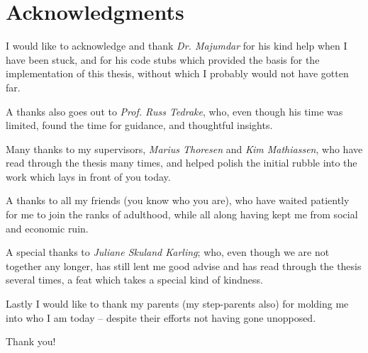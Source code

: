 \chapter*{Acknowledgments}

\noindent I would like to acknowledge and thank \textit{Dr.
  Majumdar} for his kind help when I have been stuck, and for his code stubs
which provided the basis for the implementation of this thesis, without which I
probably would not have gotten far.

\vspace{1em}

\noindent A thanks also goes out to \textit{Prof. Russ
  Tedrake}, who, even though his time was limited, found the time for guidance,
and thoughtful insights.

\vspace{1em}

\noindent Many thanks to my supervisors, \textit{Marius
  Thoresen} and \textit{Kim Mathiassen}, who have read through the thesis many
times, and helped polish the initial rubble into the work which lays in front of
you today.

\vspace{1em}

\noindent A thanks to all my friends (you know who you are),
who have waited patiently for me to join the ranks of adulthood, while all along
having kept me from social and economic ruin.

\vspace{1em}

\noindent A special thanks to \textit{Juliane Skuland
  Karling}; who, even though we are not together any longer, has still lent me
good advise and has read through the thesis several times, a feat which takes a
special kind of kindness.

\vspace{1em}

\noindent Lastly I would like to thank my parents (my step-parents
also) for molding me into who I am today -- despite their efforts not having
gone unopposed.

\vspace{1em}

\begin{center}
  \textsf{Thank you!}
\end{center}
